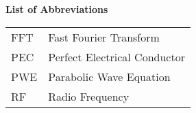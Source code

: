 \noindent\Large{\bf{List of Abbreviations}}

\vspace{24pt}

\small\normalsize

\begin{supertabular}{ll}
FFT & Fast Fourier Transform\\
PEC & Perfect Electrical Conductor\\
PWE & Parabolic Wave Equation\\
RF & Radio Frequency\\
\end{supertabular}

